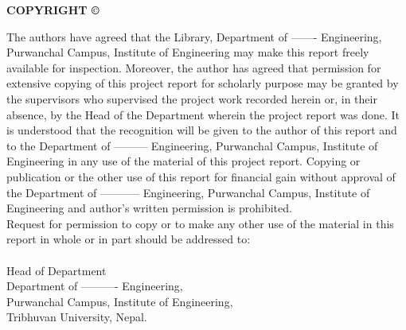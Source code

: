 \documentclass[a4paper, 12pt ]{report}
\begin{document}
	
	
	
	\newpage
	\cleardoublepage
	\setcounter{page}{4}
	\begin{center}\fontsize{18}{0} \textbf{COPYRIGHT \copyright}\end{center}
	{\normalsize The authors have agreed that the Library, Department of ------- Engineering, Purwanchal Campus, Institute of Engineering may make this report freely available for inspection. Moreover, the author has agreed that permission for extensive copying of this project report for scholarly purpose may be granted by the supervisors who supervised the project work recorded herein or, in their absence, by the Head of the Department wherein the project report was done. It is understood that the recognition will be given to the author of this report and to the Department of --------- Engineering, Purwanchal Campus, Institute of Engineering in any use of the material of this project report. Copying or publication or the other use of this report for financial gain without approval of the Department of ----------- Engineering, Purwanchal Campus, Institute of Engineering and author’s written permission is prohibited.
	\\
	Request for permission to copy or to make any other use of the material in this report in whole or in part should be addressed to: 
	\\
	\\
	Head of Department \\
	Department of ---------- Engineering, \\
	Purwanchal Campus, Institute of Engineering,\\
	Tribhuvan University, Nepal.
	}
	
	
\end{document}
